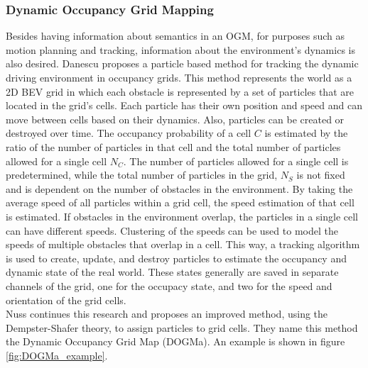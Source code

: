\subsubsection{Dynamic Occupancy Grid Mapping}
Besides having information about semantics in an \gls{OGM}, for purposes such as motion planning and tracking, information about the environment's dynamics is also desired. 
Danescu \cite{danescu2011modeling} proposes a particle based method for tracking the dynamic driving environment in occupancy grids. This method represents the world as a 2D BEV grid in which each obstacle is represented by a set of particles that are located in the grid's cells. Each particle has their own position and speed and can move between cells based on their dynamics. Also, particles can be created or destroyed over time. The occupancy probability of a cell $C$ is estimated by the ratio of the number of particles in that cell and the total number of particles allowed for a single cell $N_C$.
The number of particles allowed for a single cell is predetermined, while the total number of particles in the grid, $N_S$ is not fixed and is dependent on the number of obstacles in the environment.
By taking the average speed of all particles within a grid cell, the speed estimation of that cell is estimated. If obstacles in the environment overlap, the particles in a single cell can have different speeds. Clustering of the speeds can be used to model the speeds of multiple obstacles that overlap in a cell. This way, a tracking algorithm is used to create, update, and destroy particles to estimate the occupancy and dynamic state of the real world. These states generally are saved in separate channels of the grid, one for the occupacy state, and two for the speed and orientation of the grid cells. \\

Nuss \cite{nuss2018random} continues this research and proposes an improved method, using the Dempster-Shafer theory, to assign particles to grid cells. They name this method the Dynamic Occupancy Grid Map (DOGMa). An example is shown in figure \ref{fig:DOGMa_example}.

